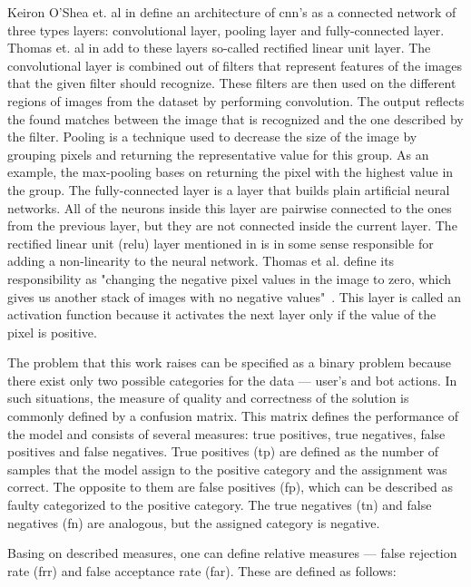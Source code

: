 Keiron O'Shea et. al in \cite{cnn-description} define an architecture of \gls{cnn}'s as a connected network of three types layers: convolutional layer, pooling layer and fully-connected layer.
Thomas et. al in \cite{thomas2020machine} add to these layers so-called rectified linear unit layer.
The convolutional layer is combined out of filters that represent features of the images that the given filter should recognize.
These filters are then used on the different regions of images from the dataset by performing convolution.
The output reflects the found matches between the image that is recognized and the one described by the filter.
Pooling is a technique used to decrease the size of the image by grouping pixels and returning the representative value for this group.
As an example, the max-pooling bases on returning the pixel with the highest value in the group.
The fully-connected layer is a layer that builds plain artificial neural networks.
All of the neurons inside this layer are pairwise connected to the ones from the previous layer, but they are not connected inside the current layer.
The rectified linear unit (\gls{relu}) layer mentioned in \cite{thomas2020machine} is in some sense responsible for adding a non-linearity to the neural network.
Thomas et al. define its responsibility as "changing the negative pixel values in the image to zero, which gives us another stack of images with no negative values"~\cite{thomas2020machine}.
This layer is called an activation function because it activates the next layer only if the value of the pixel is positive.

The problem that this work raises can be specified as a binary problem because there exist only two possible categories for the data --- user's and bot actions.
In such situations, the measure of quality and correctness of the solution is commonly defined by a confusion matrix.
This matrix defines the performance of the model and consists of several measures: true positives, true negatives, false positives and false negatives.
True positives (\gls{tp}) are defined as the number of samples that the model assign to the positive category and the assignment was correct.
The opposite to them are false positives (\gls{fp}), which can be described as faulty categorized to the positive category.
The true negatives (\gls{tn}) and false negatives (\gls{fn}) are analogous, but the assigned category is negative.

Basing on described measures, one can define relative measures --- false rejection rate (\gls{frr}) and false acceptance rate (\gls{far}).
These are defined as follows:

